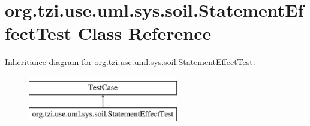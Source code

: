 \hypertarget{classorg_1_1tzi_1_1use_1_1uml_1_1sys_1_1soil_1_1_statement_effect_test}{\section{org.\-tzi.\-use.\-uml.\-sys.\-soil.\-Statement\-Effect\-Test Class Reference}
\label{classorg_1_1tzi_1_1use_1_1uml_1_1sys_1_1soil_1_1_statement_effect_test}
}
Inheritance diagram for org.\-tzi.\-use.\-uml.\-sys.\-soil.\-Statement\-Effect\-Test\-:\begin{figure}[H]
\begin{center}
\leavevmode
\includegraphics[height=2.000000cm]{classorg_1_1tzi_1_1use_1_1uml_1_1sys_1_1soil_1_1_statement_effect_test}
\end{center}
\end{figure}
